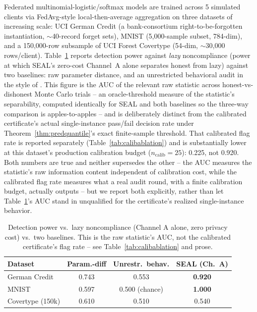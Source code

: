 \documentclass[10pt,journal,compsoc]{IEEEtran}
\begin{document}
Federated multinomial-logistic/softmax models are trained across 5 simulated clients via FedAvg-style local-then-average aggregation \cite{mcmahan2017fedavg} on three datasets of increasing scale: UCI German Credit \cite{uci_credit_g} (a bank-consortium right-to-be-forgotten instantiation, $\sim$40-record forget sets), MNIST \cite{lecun1998mnist} (5{,}000-sample subset, 784-dim), and a 150{,}000-row subsample of UCI Forest Covertype \cite{uci_covertype} (54-dim, $\sim$30{,}000 rows/client). Table~\ref{tab:classical} reports detection power against \emph{lazy} noncompliance (power at which SEAL's zero-cost Channel~A alone separates honest from lazy) against two baselines: raw parameter distance, and an unrestricted behavioral audit in the style of \cite{tang2026geometric}. This figure is the AUC of the relevant raw statistic across honest-vs-dishonest Monte Carlo trials -- an oracle-threshold measure of the statistic's separability, computed identically for SEAL and both baselines so the three-way comparison is apples-to-apples -- and is deliberately distinct from the calibrated certificate's actual single-instance pass/fail decision rate under Theorem~\ref{thm:predquantile}'s exact finite-sample threshold. That calibrated flag rate is reported separately (Table~\ref{tab:calibablation}) and is substantially lower at this dataset's production calibration budget ($n_{\text{calib}}=25$): 0.225, not 0.920. Both numbers are true and neither supersedes the other -- the AUC measures the statistic's raw information content independent of calibration cost, while the calibrated flag rate measures what a real audit round, with a finite calibration budget, actually outputs -- but we report both explicitly, rather than let Table~\ref{tab:classical}'s AUC stand in unqualified for the certificate's realized single-instance behavior.

\begin{table}[t]
\centering
\footnotesize
\caption{Detection power vs.\ lazy noncompliance (Channel A alone, zero privacy cost) vs.\ two baselines. This is the raw statistic's AUC, not the calibrated certificate's flag rate -- see Table~\ref{tab:calibablation} and prose.}
\label{tab:classical}
\begin{tabular}{@{}lccc@{}}
\toprule
Dataset & Param.-diff & Unrestr.\ behav. & SEAL (Ch.\ A) \\
\midrule
German Credit & 0.743 & 0.553 & \textbf{0.920} \\
MNIST & 0.597 & 0.500 (chance) & \textbf{1.000} \\
Covertype (150k) & 0.610 & 0.510 & 0.540 \\
\bottomrule
\end{tabular}
\end{table}
\end{document}
